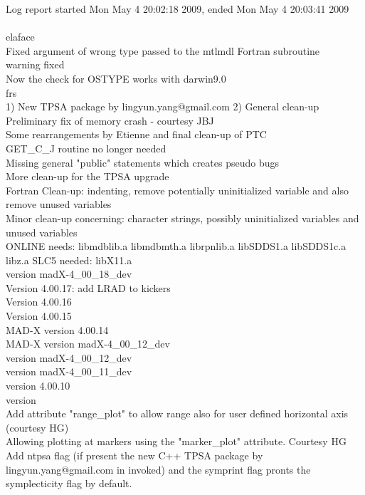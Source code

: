 Log report started Mon May  4 20:02:18 2009, ended Mon May  4 20:03:41 2009
\\
\\
elaface \\ 
 Fixed argument of wrong type passed to the mtlmdl Fortran subroutine  \\ 
  warning fixed  \\ 
 Now the check for OSTYPE works with darwin9.0  \\ 
frs \\ 
1) New TPSA package by lingyun.yang@gmail.com 2) General clean-up  \\ 
Preliminary fix of memory crash - courtesy JBJ  \\ 
Some rearrangements by Etienne and final clean-up of PTC  \\ 
GET\_C\_J routine no longer needed  \\ 
Missing general "public" statements which creates pseudo bugs  \\ 
More clean-up for the TPSA upgrade  \\ 
Fortran Clean-up: indenting, remove potentially uninitialized variable and also remove unused variables  \\ 
Minor clean-up concerning: character strings, possibly uninitialized variables and unused variables  \\ 
ONLINE needs: libmdblib.a libmdbmth.a librpnlib.a libSDDS1.a libSDDS1c.a libz.a SLC5 needed: libX11.a  \\ 
version madX-4\_00\_18\_dev  \\ 
Version 4.00.17: add LRAD to kickers  \\ 
Version 4.00.16  \\ 
Version 4.00.15  \\ 
MAD-X version 4.00.14  \\ 
MAD-X version madX-4\_00\_12\_dev  \\ 
version madX-4\_00\_12\_dev  \\ 
version madX-4\_00\_11\_dev  \\ 
version 4.00.10  \\ 
version  \\ 
Add attribute "range\_plot" to allow range also for user defined horizontal axis               (courtesy HG)  \\ 
Allowing plotting at markers using the "marker\_plot" attribute. Courtesy HG  \\ 
Add ntpsa flag (if present the new C++ TPSA package by lingyun.yang@gmail.com in invoked) and the symprint flag pronts the symplecticity flag by default.  \\ 
